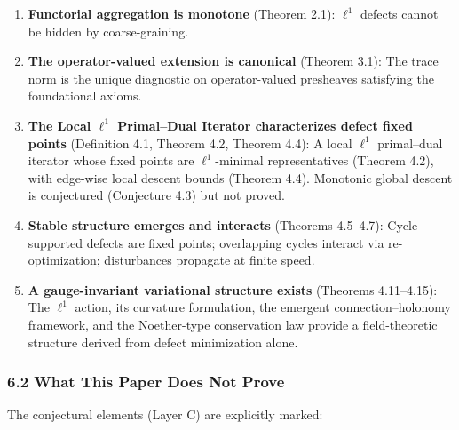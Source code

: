 \documentclass[
]{article}
\begin{document}
\begin{enumerate}
\def\labelenumi{\arabic{enumi}.}
\item
  \textbf{Functorial aggregation is monotone} (Theorem 2.1): \(\ell^1\)
  defects cannot be hidden by coarse-graining.
\item
  \textbf{The operator-valued extension is canonical} (Theorem 3.1): The
  trace norm is the unique diagnostic on operator-valued presheaves
  satisfying the foundational axioms.
\item
  \textbf{The Local \(\ell^1\) Primal--Dual Iterator characterizes
  defect fixed points} (Definition 4.1, Theorem 4.2, Theorem 4.4): A
  local \(\ell^1\) primal--dual iterator whose fixed points are
  \(\ell^1\)-minimal representatives (Theorem 4.2), with edge-wise local
  descent bounds (Theorem 4.4). Monotonic global descent is conjectured
  (Conjecture 4.3) but not proved.
\item
  \textbf{Stable structure emerges and interacts} (Theorems 4.5--4.7):
  Cycle-supported defects are fixed points; overlapping cycles interact
  via re-optimization; disturbances propagate at finite speed.
\item
  \textbf{A gauge-invariant variational structure exists} (Theorems
  4.11--4.15): The \(\ell^1\) action, its curvature formulation, the
  emergent connection--holonomy framework, and the Noether-type
  conservation law provide a field-theoretic structure derived from
  defect minimization alone.
\end{enumerate}

\subsubsection{6.2 What This Paper Does Not
Prove}\label{what-this-paper-does-not-prove}

The conjectural elements (Layer C) are explicitly marked:
\end{document}
